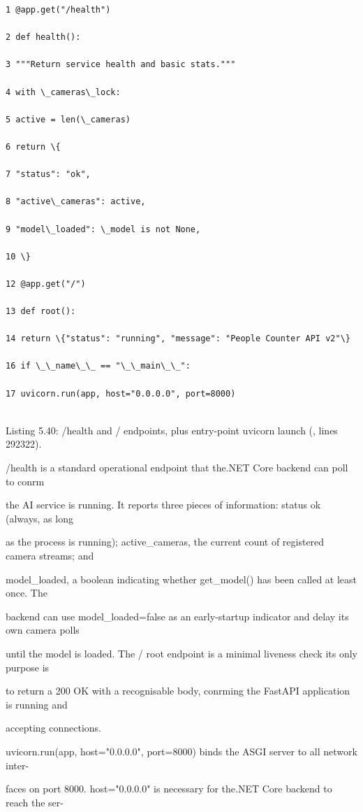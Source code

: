 \begin{listingbox}
	\begin{verbatim}
1 @app.get("/health")

2 def health():

3 """Return service health and basic stats."""

4 with \_cameras\_lock:

5 active = len(\_cameras)

6 return \{

7 "status": "ok",

8 "active\_cameras": active,

9 "model\_loaded": \_model is not None,

10 \}

12 @app.get("/")

13 def root():

14 return \{"status": "running", "message": "People Counter API v2"\}

16 if \_\_name\_\_ == "\_\_main\_\_":

17 uvicorn.run(app, host="0.0.0.0", port=8000)


\end{verbatim}
\end{listingbox}
Listing 5.40: /health and / endpoints, plus entry-point uvicorn launch (, lines 292322).

/health is a standard operational endpoint that the.NET Core backend can poll to conrm

the AI service is running. It reports three pieces of information: status ok (always, as long

as the process is running); active\_cameras, the current count of registered camera streams; and

model\_loaded, a boolean indicating whether get\_model() has been called at least once. The

backend can use model\_loaded=false as an early-startup indicator and delay its own camera polls

until the model is loaded. The / root endpoint is a minimal liveness check  its only purpose is

to return a 200 OK with a recognisable body, conrming the FastAPI application is running and

accepting connections.

uvicorn.run(app, host="0.0.0.0", port=8000) binds the ASGI server to all network inter-

faces on port 8000. host="0.0.0.0" is necessary for the.NET Core backend to reach the ser-

